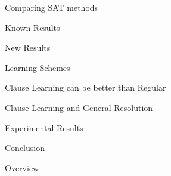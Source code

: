 \documentclass[page number]{beamer}
\begin{document}
\begin{frame}{Comparing SAT methods}
\end{frame}

\begin{frame}{Known Results}
\end{frame}

\begin{frame}{New Results}
\end{frame}

\begin{frame}{Learning Schemes}
\end{frame}

\begin{frame}{Clause Learning can be better than Regular}
\end{frame}

\begin{frame}{Clause Learning and General Resolution}
\end{frame}

\begin{frame}{Experimental Results}
\end{frame}

\begin{frame}{Conclusion}
\end{frame}

\begin{frame}{Overview}
\end{frame}
\end{document}

